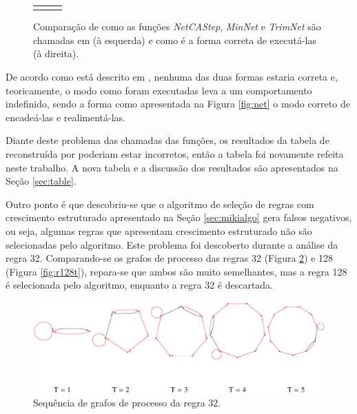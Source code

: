 \documentclass[12pt,a4paper]{article}
\begin{document}
\begin{figure}
\begin{center}
\begin{tabular}{c c c}
\begin{tikzpicture}[node distance = 4cm, auto, scale=0.55, transform shape]

\end{tikzpicture} &
\begin{tikzpicture}[node distance = 4cm, auto, scale=0.55, transform shape]

\end{tikzpicture} &
\begin{tikzpicture}[node distance=6cm, auto, scale=0.5, transform shape]

\end{tikzpicture} \\
\end{tabular}
\caption[Comparação de encadeamento das funções \emph{NetCAStep}, \emph{MinNet} e \emph{TrimNet}]
{Comparação de como as funções \emph{NetCAStep}, \emph{MinNet} e \emph{TrimNet} são
chamadas em  (à esquerda) e como é a forma correta de
executá-las (à direita).}
\label{fig:net-miki}
\end{center}
\end{figure}

De acordo como está descrito em
, nenhuma das duas formas estaria correta e,
teoricamente, o modo como foram executadas leva a um comportamento indefinido,
sendo a forma como apresentada na Figura \ref{fig:net} o modo correto de
encadeá-las e realimentá-las.

Diante deste problema das chamadas das funções, os resultados da tabela de
 reconstruída por  poderiam
estar incorretos, então a tabela foi novamente refeita neste trabalho. A nova tabela e a
discussão dos resultados são apresentados na Seção \ref{sec:table}.

Outro ponto é que descobriu-se que o algoritmo de seleção de regras com
crescimento estruturado apresentado na Seção \ref{sec:mikialgo} gera falsos
negativos, ou seja, algumas regras que apresentam crescimento estruturado
não são selecionadas pelo algoritmo. Este problema foi descoberto durante
a análise da regra 32. Comparando-se os grafos de processo das regras
32 (Figura \ref{fig:r32t}) e 128 (Figura \ref{fig:r128t}), repara-se que
ambos são muito semelhantes, mas a regra 128 é selecionada pelo algoritmo,
enquanto a regra 32 é descartada.

\begin{figure}[htp]
\begin{center}
\includegraphics[scale=0.70]{img/Rule32.eps}
\caption{Sequência de grafos de processo da regra 32.}
\label{fig:r32t}
\end{center}
\end{figure}
\end{document}
